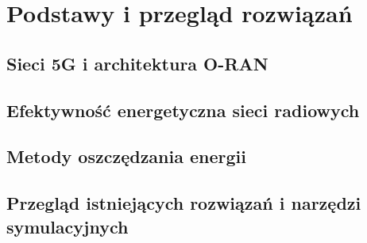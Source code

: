 \chapter{Podstawy i przegląd rozwiązań}
\label{chap:2}

\section{Sieci 5G i architektura O-RAN}
\label{sec:2:1}

\section{Efektywność energetyczna sieci radiowych}
\label{sec:2:2}

\section{Metody oszczędzania energii}
\label{sec:2:3}

\section{Przegląd istniejących rozwiązań i narzędzi symulacyjnych}
\label{sec:2:4}
